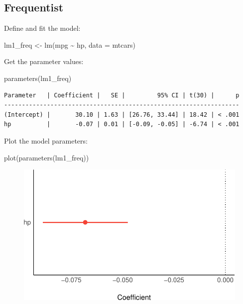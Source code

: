 \documentclass[
  letterpaper,
  DIV=11,
  numbers=noendperiod]{scrreprt}
\newenvironment{Shaded}{\begin{snugshade}}{\end{snugshade}}
\newcommand{\AttributeTok}[1]{\textcolor[rgb]{0.40,0.45,0.13}{#1}}
\newcommand{\FunctionTok}[1]{\textcolor[rgb]{0.28,0.35,0.67}{#1}}
\newcommand{\NormalTok}[1]{\textcolor[rgb]{0.00,0.23,0.31}{#1}}
\newcommand{\OtherTok}[1]{\textcolor[rgb]{0.00,0.23,0.31}{#1}}
\newcommand{\SpecialCharTok}[1]{\textcolor[rgb]{0.37,0.37,0.37}{#1}}
\theoremstyle{definition}
\theoremstyle{definition}
\theoremstyle{remark}
\begin{document}
\hypertarget{frequentist}{%
\subsection{Frequentist}\label{frequentist}}

Define and fit the model:

\begin{Shaded}
\begin{Highlighting}[]
\NormalTok{lm1\_freq }\OtherTok{\textless{}{-}} \FunctionTok{lm}\NormalTok{(mpg }\SpecialCharTok{\textasciitilde{}}\NormalTok{ hp, }\AttributeTok{data =}\NormalTok{ mtcars)}
\end{Highlighting}
\end{Shaded}

Get the parameter values:

\begin{Shaded}
\begin{Highlighting}[]
\FunctionTok{parameters}\NormalTok{(lm1\_freq)}
\end{Highlighting}
\end{Shaded}

\begin{verbatim}
Parameter   | Coefficient |   SE |         95% CI | t(30) |      p
------------------------------------------------------------------
(Intercept) |       30.10 | 1.63 | [26.76, 33.44] | 18.42 | < .001
hp          |       -0.07 | 0.01 | [-0.09, -0.05] | -6.74 | < .001
\end{verbatim}

Plot the model parameters:

\begin{Shaded}
\begin{Highlighting}[]
\FunctionTok{plot}\NormalTok{(}\FunctionTok{parameters}\NormalTok{(lm1\_freq))}
\end{Highlighting}
\end{Shaded}

\begin{figure}[H]

{\centering \includegraphics{./regression1_files/figure-pdf/plot-lm1-freq-1.pdf}

}

\end{figure}
\end{document}
